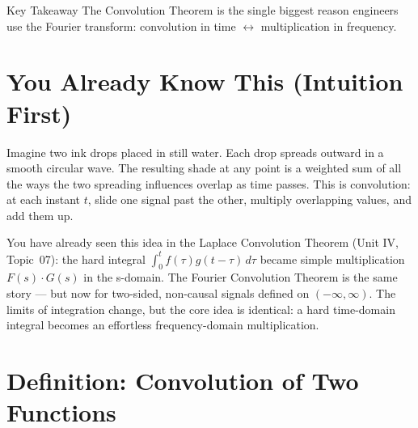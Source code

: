 \documentclass[12pt,a4paper]{article}
\begin{document}
\begin{learnbox}{Key Takeaway}
The Convolution Theorem is the single biggest reason engineers use the Fourier
transform: convolution in time $\longleftrightarrow$ multiplication in frequency.
\end{learnbox}

\section{You Already Know This (Intuition First)}

Imagine two ink drops placed in still water. Each drop spreads outward in a smooth
circular wave. The resulting shade at any point is a weighted sum of all the ways
the two spreading influences overlap as time passes. This is convolution: at each
instant $t$, slide one signal past the other, multiply overlapping values, and add
them up.

You have already seen this idea in the Laplace Convolution Theorem (Unit IV,
Topic~07): the hard integral $\int_0^t f(\tau)g(t-\tau)\,d\tau$ became simple
multiplication $F(s)\cdot G(s)$ in the s-domain. The Fourier Convolution Theorem
is the same story --- but now for two-sided, non-causal signals defined on
$(-\infty,\infty)$. The limits of integration change, but the core idea is
identical: a hard time-domain integral becomes an effortless frequency-domain
multiplication.

\section{Definition: Convolution of Two Functions}
\end{document}
